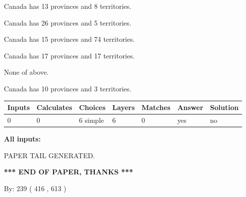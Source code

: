 \documentclass[12pt]{article}
\begin{document}
 
Canada has  13 provinces and  8 territories.
 
 
Canada has  26 provinces and  5 territories.
 
 
Canada has  15 provinces and  74 territories.
 
 
Canada has  17 provinces and  17 territories.
 
 
 None of above.
 
 
\noindent{}
 
 
Canada has 10  provinces and 3 territories.
 
 
\noindent{}
 
 
   
   
   
   
\noindent\begin{tabular}{|l|l|l|l|l|l|l|}
 \hline
Inputs & Calculates & Choices & Layers & Matches & Answer & Solution \\ \hline
 0  & 
 0  & 
 6
  simple  
  & 
 6  & 
 0  & 
  yes & 
  no 
  \\ \hline
 \end{tabular}
   
   
   
   
\noindent{}
   
   
   
   
\noindent\vspace{0.1in}\hspace{-0.08in} {\textbf{\Large{All inputs: }}}
   
   
   
   
   
   
 \vspace{0.2in}
 
   
   
\vspace{2.0in} PAPER TAIL GENERATED.
   
   
   
   
\vspace{1.0in} 
{\textbf{\large{ *** END OF PAPER, THANKS *** }}} 
   
   
\hspace{1.0in} By: 
 239 ( 416 ,  613 )
   
\end{document}
